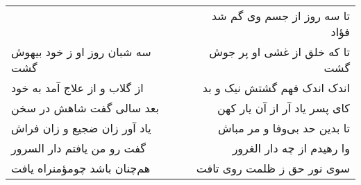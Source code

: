 \begin{center}
\begin{longtable}{l p{0.5cm} r}
&&
تا سه روز از جسم وی گم شد فؤاد
\\
سه شبان روز او ز خود بیهوش گشت
&&
تا که خلق از غشی او پر جوش گشت
\\
از گلاب و از علاج آمد به خود
&&
اندک اندک فهم گشتش نیک و بد
\\
بعد سالی گفت شاهش در سخن
&&
کای پسر یاد آر از آن یار کهن
\\
یاد آور زان ضجیع و زان فراش
&&
تا بدین حد بی‌وفا و مر مباش
\\
گفت رو من یافتم دار السرور
&&
وا رهیدم از چه دار الغرور
\\
هم‌چنان باشد چومؤمنراه یافت
&&
سوی نور حق ز ظلمت روی تافت
\\
\end{longtable}
\end{center}
